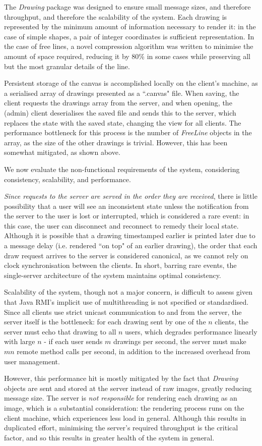 \documentclass[12pt,a4paper]{report}
\begin{document}
The \textit{Drawing} package was designed to ensure small message sizes, and therefore throughput, and therefore the scalability of the system. Each drawing is represented by the minimum amount of information necessary to render it: in the case of simple shapes, a pair of integer coordinates is sufficient representation. In the case of free lines, a novel compression algorithm was written to minimise the amount of space required, reducing it by 80\% in some cases while preserving all but the most granular details of the line. 

Persistent storage of the canvas is accomplished locally on the client's machine, as a serialised array of drawings presented as a ``.canvas" file. When saving, the client requests the drawings array from the server, and when opening, the (admin) client deserialises the saved file and sends this to the server, which replaces the state with the saved state, changing the view for all clients. The performance bottleneck for this process is the number of \textit{FreeLine} objects in the array, as the size of the other drawings is trivial. However, this has been somewhat mitigated, as shown above. 

We now evaluate the non-functional requirements of the system, considering consistency, scalability, and performance.

\textit{Since requests to the server are served in the order they are received}, there is little possibility that a user will see an inconsistent state unless the notification from the server to the user is lost or interrupted, which is considered a rare event: in this case, the user can disconnect and reconnect to remedy their local state. Although it is possible that a drawing timestamped earlier is printed later due to a message delay (i.e. rendered ``on top" of an earlier drawing), the order that each draw request arrives to the server is considered canonical, as we cannot rely on clock synchronisation between the clients. In short, barring rare events, the single-server architecture of the system maintains optimal consistency. 

Scalability of the system, though not a major concern, is difficult to assess given that Java RMI's implicit use of multithreading is not specified or standardised. Since all clients use strict unicast communication to and from the server, the server itself is the bottleneck: for each drawing sent by one of the $n$ clients, the server must echo that drawing to all $n$ users, which degrades performance linearly with large $n$ - if each user sends $m$ drawings per second, the server must make $mn$ remote method calls per second, in addition to the increased overhead from user management. 

However, this performance hit is mostly mitigated by the fact that \textit{Drawing} objects are sent and stored at the server instead of raw images, greatly reducing message size. The server is \textit{not responsible} for rendering each drawing as an image, which is a substantial consideration: the rendering process runs on the client machine, which experiences less load in general. Although this results in duplicated effort, minimising the server's required throughput is the critical factor, and so this results in greater health of the system in general.
\end{document}
